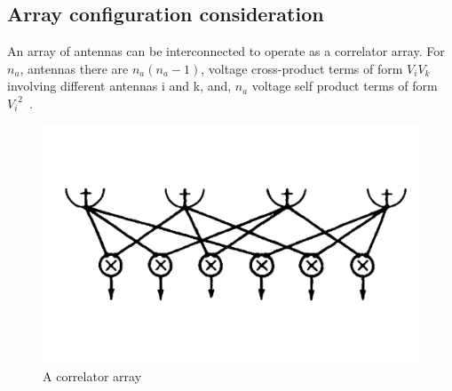 \subsection{Array configuration consideration}
An array of antennas can be interconnected to operate as a correlator array. For $n_a$, antennas there are $n_a(n_a - 1)$, voltage cross-product terms of form $V_iV_k$ involving different antennas i and k, and, $n_a$ voltage self product terms of form ${V_i}^2${~\citep[Pg. 130,~Sec.~5.3]{thompson2008interferometry}}.
\begin{figure}[htbp]
\center
    \includegraphics[scale= 0.2]{Figures/correlarray}
 	\caption[A correlator array   ]{A correlator array~\citep[Pg.~130,~Fig.~5.4(b)]{thompson2008interferometry}}
	\label{fig:correlArray}
\end{figure}
